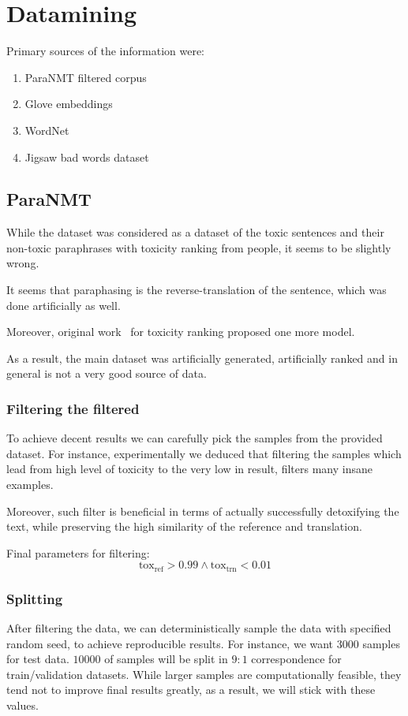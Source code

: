 \section{Datamining}

Primary sources of the information were:

\begin{enumerate}
    \item ParaNMT filtered corpus~\cite{}
    \item Glove embeddings~\cite{}
    \item WordNet~\cite{}
    \item Jigsaw bad words dataset~\cite{}
\end{enumerate}

\subsection{ParaNMT}

While the dataset was considered as a dataset of the toxic sentences and their
non-toxic paraphrases with toxicity ranking from people, it seems to be
slightly wrong.

It seems that paraphasing is the reverse-translation of the sentence, which was
done artificially as well.

Moreover, original work~\cite{} for toxicity ranking proposed one more model.

As a result, the main dataset was artificially generated, artificially ranked
and in general is not a very good source of data.

\subsubsection{Filtering the filtered}

To achieve decent results we can carefully pick the samples from the provided
dataset. For instance, experimentally we deduced that filtering the samples
which lead from high level of toxicity to the very low in result, filters many
insane examples.

Moreover, such filter is beneficial in terms of actually successfully
detoxifying the text, while preserving the high similarity of the reference and
translation.

Final parameters for filtering:
\begin{equation}\text{tox}_\text{ref} > 0.99 \wedge \text{tox}_\text{trn} < 0.01\end{equation}

\subsubsection{Splitting}

After filtering the data, we can deterministically sample the data with
specified random seed, to achieve reproducible results. For instance, we want
\(3000\) samples for test data. \(10000\) of samples will be split in \(9:1\)
correspondence for train/validation datasets. While larger samples are
computationally feasible, they tend not to improve final results greatly, as a
result, we will stick with these values.


